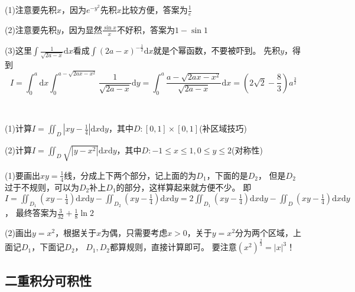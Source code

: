 \begin{solution}
  (1)注意要先积$x$，因为$e^{-y^2}$先积$x$比较方便，答案为$\frac{1}{e}$

  (2)注意要先积$y$，因为显然$\frac{\sin x}{x}$不好积，答案为$1 - \sin 1$

  (3)这里$\int \frac{1}{\sqrt{2a - x}}\mathrm{d}x$看成$\int (2a - x)^{-\frac{1}{2}}\mathrm{d}x$就是个幂函数，不要被吓到。
  先积$y$，得到
  \begin{equation*}
    I = \int_0^a \mathrm{d}x \int_0^{a - \sqrt{2ax - x^2}} \frac{1}{\sqrt{2a - x}}\mathrm{d}y = \int _0^a \frac{a - \sqrt{2ax - x^2}}{\sqrt{2a - x}} \mathrm{d} x= (2 \sqrt{2} - \frac{8}{3})a^{\frac{3}{2}}
  \end{equation*}
\end{solution}

~

\begin{exercise}[几个进阶题]
  (1)计算$I = \iint_D |xy - \frac{1}{4}| \mathrm{d}x\mathrm{d}y$，其中$D: [0,1]\times [0,1]$(补区域技巧)

  (2)计算$I = \iint_D \sqrt{|y - x^2|}\mathrm{d}x\mathrm{d}y$，其中$D: -1 \leq x \leq 1, 0 \leq y \leq 2$(对称性)
\end{exercise}

\begin{solution}
  (1)要画出$xy = \frac{1}{4}$线，分成上下两个部分，记上面的为$D_1$，下面的是$D_2$，
  但是$D_2$过于不规则，可以为$D_2$补上$D_1$的部分，这样算起来就方便不少。
  即$I = \iint _{D_1}(xy - \frac{1}{4})\mathrm{d}x\mathrm{d}y - \iint _{D_2} (xy - \frac{1}{4})\mathrm{d}x\mathrm{d}y = 2\iint _{D_1} (xy - \frac{1}{4})\mathrm{d}x\mathrm{d}y - \iint_D (xy - \frac{1}{4})\mathrm{d}x\mathrm{d}y $，
  最终答案为$\frac{3}{32} + \frac{1}{8} \ln 2$

  (2)画出$y = x^2$，根据关于$x$为偶，只需要考虑$x > 0$，关于$y = x^2$分为两个区域，上面记$D_1$，下面记$D_2$，
  $D_1,D_2$都算规则，直接计算即可。
  要注意$(x^2)^{\frac{2}{3} } = |x|^3$！
\end{solution}


\subsection{二重积分可积性}

